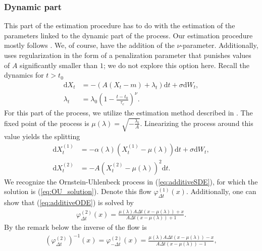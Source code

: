 \subsubsection{Dynamic part}\label{subsubsec:OUprocessDynamic}
This part of the estimation procedure has to do with the estimation of the parameters linked to the dynamic part of the process. Our estimation procedure mostly follows \cite{Ditlevsen2023}. We, of course, have the addition of the $\nu$-parameter. Additionally, \cite{Ditlevsen2023} uses regularization in the form of a penalization parameter that punishes values of $A$ significantly smaller than $1$; we do not explore this option here. Recall the dynamics for $t>t_0$
\begin{align}
    \mathrm{d}X_t &= -\left(A\left(X_t - m\right) + \lambda_t\right)\mathrm{d}t + \sigma \mathrm{d}W_t \label{eq:additiveDynamicPart},\\
    \lambda_t &= \lambda_0\left(1 - \frac{t - t_0}{\tau_c}\right)^\nu.
\end{align}
For this part of the process, we utilize the estimation method described in \cite{DitlevsenSupplementary}. The fixed point of the process is $\mu\left(\lambda\right) = \sqrt{-\frac{\lambda_t}{A}}$. Linearizing the process around this value yields the splitting
\begin{align}
    \mathrm{d}X_t^{(1)} &= -\alpha\left(\lambda\right)\left(X_t^{(1)} - \mu\left(\lambda\right)\right)\mathrm{d}t + \sigma \mathrm{d}W_t, \label{eq:additiveSDE}\\
    \mathrm{d}X_t^{(2)} &= -A \left(X_t^{(2)} - \mu\left(\lambda\right)\right)^2\mathrm{d}t. \label{eq:additiveODE}
\end{align}
We recognize the Ornstein-Uhlenbeck process in (\ref{eq:additiveSDE}), for which the solution is (\ref{eq:OU_solution}). Denote this flow $\varphi_{\Delta t}^{(1)}(x)$. Additionally, one can show that (\ref{eq:additiveODE}) is solved by 
\begin{align}
    \varphi^{(2)}_{\Delta t}(x) = \frac{\mu\left(\lambda\right)A\Delta t\left(x - \mu\left(\lambda\right)\right) + x}{A\Delta t\left(x- \mu\left(\lambda\right)\right) + 1}.
\end{align}
By the remark below \cite[equation (9)]{SplittingSchemes} the inverse of the flow is
\begin{align}
    \left(\varphi^{(2)}_{\Delta t}\right)^{-1}(x) = \varphi^{(2)}_{-\Delta t}(x) = \frac{\mu\left(\lambda\right)A\Delta t\left(x - \mu\left(\lambda\right)\right) - x}{A\Delta t\left(x- \mu\left(\lambda\right)\right) - 1},
\end{align}
